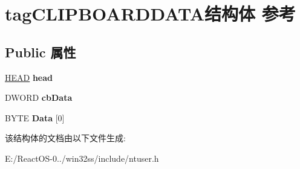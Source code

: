 \hypertarget{structtag_c_l_i_p_b_o_a_r_d_d_a_t_a}{}\section{tag\+C\+L\+I\+P\+B\+O\+A\+R\+D\+D\+A\+T\+A结构体 参考}
\label{structtag_c_l_i_p_b_o_a_r_d_d_a_t_a}
\subsection*{Public 属性}
\begin{DoxyCompactItemize}
\item 
\mbox{\label{structtag_c_l_i_p_b_o_a_r_d_d_a_t_a_a02ed8f096e604ef0494e8bb8b5474d94}} 
\hyperlink{struct___h_e_a_d}{H\+E\+AD} {\bfseries head}
\item 
\mbox{\label{structtag_c_l_i_p_b_o_a_r_d_d_a_t_a_aaa94e9dcc07e7e4e350b9f8c95465f8d}} 
D\+W\+O\+RD {\bfseries cb\+Data}
\item 
\mbox{\label{structtag_c_l_i_p_b_o_a_r_d_d_a_t_a_a854ae9315f3c56d1ef71c81074444c80}} 
B\+Y\+TE {\bfseries Data} \mbox{[}0\mbox{]}
\end{DoxyCompactItemize}


该结构体的文档由以下文件生成\+:\begin{DoxyCompactItemize}
\item 
E\+:/\+React\+O\+S-\/0../win32ss/include/ntuser.\+h\end{DoxyCompactItemize}
